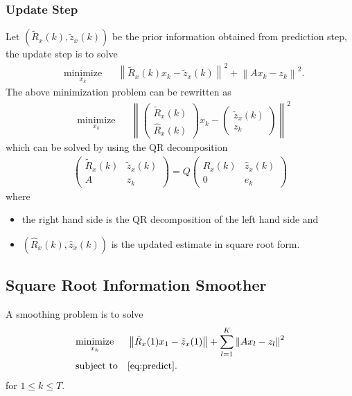 \documentclass[microtype]{gtpart}     %
\theoremstyle{definition}
\newcommand{\norm}[1]{\left\lVert#1\right\rVert}
\begin{document}
\subsubsection{Update Step}

Let $(\tilde{R}_x(k), \tilde{z}_x(k))$ be the prior information obtained from prediction step, 
the update step is to solve
\begin{align*}
	& \underset{x_k}{\text{minimize}} & &\norm{\tilde{R}_x(k)x_k - \tilde{z}_x(k)}^2 + \norm{Ax_k - z_k}^2.
\end{align*}
The above minimization problem can be rewritten as
\begin{align*}
	& \underset{x_k}{\text{minimize}} & &\norm{
	\begin{pmatrix}
	\tilde{R}_x(k) \\ \hat{R}_x(k)
	\end{pmatrix}x_k - 
	\begin{pmatrix}
	\tilde{z}_x(k) \\  z_k
	\end{pmatrix}}^2
\end{align*}
which can be solved by using the QR decomposition
\begin{align*}
	\begin{pmatrix}
		\tilde{R}_x(k) &\tilde{z}_x(k) \\ 
		A &z_k
	\end{pmatrix} = Q
	\begin{pmatrix}
		\hat{R}_x(k) &\hat{z}_x(k) \\
		0 &e_k
	\end{pmatrix}
\end{align*}
where
\begin{itemize}
	\item the right hand side is the QR decomposition of the left hand side and
	\item $(\hat{R}_x(k), \hat{z}_x(k))$ is the updated estimate in square root form.
\end{itemize}

\subsection{Square Root Information Smoother}

A smoothing problem is to solve
\begin{align*}
& \underset{x_k}{\text{minimize}} & & \norm{\tilde{R}_x(1)x_1 - \tilde{z}_x(1)} + \sum_{l=1}^{K}\norm{Ax_l - z_l}^2 \\
& \text{subject to} & & \cref{eq:predict}.
\end{align*}
for $1\leq k \leq T$.
\end{document}
